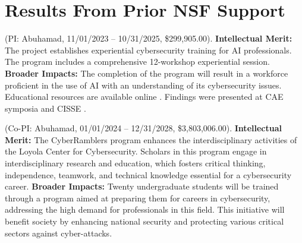 \section{Results From Prior NSF Support}

 (PI: Abuhamad, 11/01/2023 -- 10/31/2025, \$299,905.00). 
\textbf{Intellectual Merit:} The project establishes experiential cybersecurity training for AI professionals. The program includes a comprehensive 12-workshop experiential session. %
\textbf{Broader Impacts:}
The completion of the program will result in a workforce proficient in the use of AI with an understanding of its cybersecurity issues. %
Educational resources are available online \cite{secureai_website}. Findings were presented at CAE symposia and CISSE \cite{secureai_findings,secureai_findings_2}.

 (Co-PI: Abuhamad, 01/01/2024 --  12/31/2028, \$3,803,006.00). 
\textbf{Intellectual Merit:}
The CyberRamblers program enhances the interdisciplinary activities of the Loyola Center for Cybersecurity. Scholars in this program engage in interdisciplinary research and education, which fosters critical thinking, independence, teamwork, and technical knowledge essential for a cybersecurity career. %
\textbf{Broader Impacts:}
Twenty undergraduate students will be trained through a program aimed at preparing them for careers in cybersecurity, addressing the high demand for professionals in this field. %
 This initiative will benefit society by enhancing national security and protecting various critical sectors against cyber-attacks.

